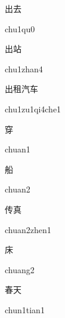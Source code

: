 \begin{verbete}[chu1qu0]{出去}
\begin{pronuncia}{chu1qu0}
\end{pronuncia}
\end{verbete}

\begin{verbete}{出站}
\begin{pronuncia}{chu1zhan4}
\end{pronuncia}
\end{verbete}

\begin{verbete}{出租汽车}
\begin{pronuncia}{chu1zu1qi4che1}
\end{pronuncia}
\end{verbete}

\begin{verbete}[chuan1]{穿}
\begin{pronuncia}{chuan1}
\end{pronuncia}
\end{verbete}

\begin{verbete}[chuan2]{船}
\begin{pronuncia}{chuan2}
\end{pronuncia}
\end{verbete}

\begin{verbete}{传真}
\begin{pronuncia}{chuan2zhen1}
\end{pronuncia}
\end{verbete}

\begin{verbete}[chuang2]{床}
\begin{pronuncia}{chuang2}
\end{pronuncia}
\end{verbete}

\begin{verbete}{春天}
\begin{pronuncia}{chun1tian1}
\end{pronuncia}
\end{verbete}

